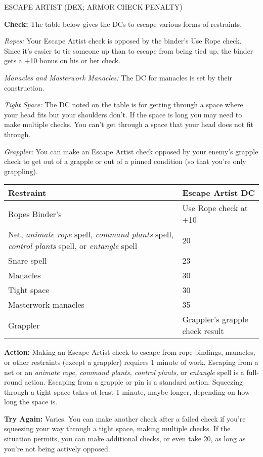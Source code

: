 \documentclass{article}
\begin{document}
\vspace{12pt}
ESCAPE ARTIST (DEX; ARMOR CHECK PENALTY)

\textbf{Check:} The table below gives the DCs to escape various forms of restraints.

\textit{Ropes: }Your Escape Artist check is opposed by the binder's Use Rope check. 
Since it's easier to tie someone up than to escape from being tied up, the binder 
gets a +10 bonus on his or her check.

\textit{Manacles and Masterwork Manacles: }The DC for manacles is set by their 
construction.

\textit{Tight Space: }The DC noted on the table is for getting through a space 
where your head fits but your shoulders don't. If the space is long you may need 
to make multiple checks. You can't get through a space that your head does not 
fit through.

\textit{Grappler: }You can make an Escape Artist check opposed by your enemy's 
grapple check to get out of a grapple or out of a pinned condition (so that you're 
only grappling).

\vspace{12pt}
\begin{tabular}{|>{\raggedright}p{173pt}|>{\raggedright}p{132pt}|}
\hline
R\textbf{estraint } & E\textbf{scape Artist DC}\tabularnewline
\hline
Ropes Binder's  & Use Rope check at +10\tabularnewline
\hline
Net, \textit{animate rope }spell, \textit{command plants }spell, \textit{control 
plants }spell, or \textit{entangle }spell & 20\tabularnewline
\hline
Snare spell  & 23\tabularnewline
\hline
Manacles  & 30\tabularnewline
\hline
Tight space  & 30\tabularnewline
\hline
Masterwork manacles  & 35\tabularnewline
\hline
Grappler  & Grappler's grapple check result\tabularnewline
\hline
\end{tabular}

\vspace{12pt}
\textbf{Action:} Making an Escape Artist check to escape from rope bindings, manacles, 
or other restraints (except a grappler) requires 1 minute of work. Escaping from 
a net or an \textit{animate rope, command plants, control plants, }or \textit{entangle 
}spell is a full-round action. Escaping from a grapple or pin is a standard action. 
Squeezing through a tight space takes at least 1 minute, maybe longer, depending 
on how long the space is.

\textbf{Try Again:} Varies. You can make another check after a failed check if 
you're squeezing your way through a tight space, making multiple checks. If the 
situation permits, you can make additional checks, or even take 20, as long as 
you're not being actively opposed.
\end{document}
